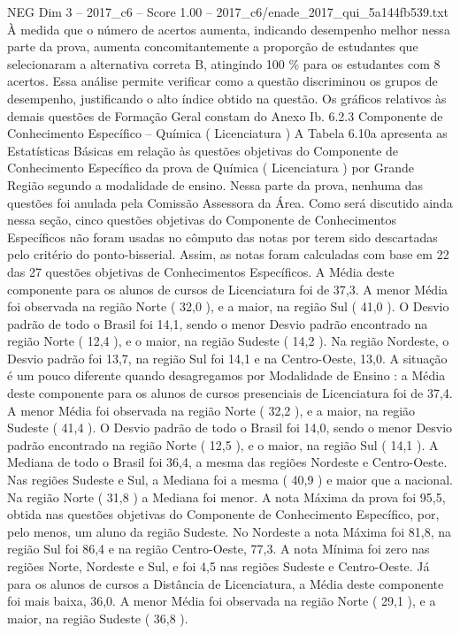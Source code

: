 \begin{textsample}{NEG Dim 3 – 2017\_c6 – Score 1.00 – 2017\_c6/enade\_2017\_qui\_5a144fb539.txt}
À medida que o número de acertos aumenta, indicando desempenho melhor nessa parte da prova, aumenta concomitantemente a proporção de estudantes que selecionaram a alternativa correta B, atingindo 100 \% para os estudantes com 8 acertos.
Essa análise permite verificar como a questão discriminou os grupos de desempenho, justificando o alto índice obtido na questão.
Os gráficos relativos às demais questões de Formação Geral constam do Anexo Ib. 6.2.3 Componente de Conhecimento Específico – Química ( Licenciatura ) A Tabela 6.10a apresenta as Estatísticas Básicas em relação às questões objetivas do Componente de Conhecimento Específico da prova de Química ( Licenciatura ) por Grande Região segundo a modalidade de ensino.
Nessa parte da prova, nenhuma das questões foi anulada pela Comissão Assessora da Área.
Como será discutido ainda nessa seção, cinco questões objetivas do Componente de Conhecimentos Específicos não foram usadas no cômputo das notas por terem sido descartadas pelo critério do ponto-bisserial.
Assim, as notas foram calculadas com base em 22 das 27 questões objetivas de Conhecimentos Específicos.
A Média deste componente para os alunos de cursos de Licenciatura foi de 37,3.
A menor Média foi observada na região Norte ( 32,0 ), e a maior, na região Sul ( 41,0 ).
O Desvio padrão de todo o Brasil foi 14,1, sendo o menor Desvio padrão encontrado na região Norte ( 12,4 ), e o maior, na região Sudeste ( 14,2 ).
Na região Nordeste, o Desvio padrão foi 13,7, na região Sul foi 14,1 e na Centro-Oeste, 13,0.
A situação é um pouco diferente quando desagregamos por Modalidade de Ensino : a Média deste componente para os alunos de cursos presenciais de Licenciatura foi de 37,4.
A menor Média foi observada na região Norte ( 32,2 ), e a maior, na região Sudeste ( 41,4 ).
O Desvio padrão de todo o Brasil foi 14,0, sendo o menor Desvio padrão encontrado na região Norte ( 12,5 ), e o maior, na região Sul ( 14,1 ).
A Mediana de todo o Brasil foi 36,4, a mesma das regiões Nordeste e Centro-Oeste.
Nas regiões Sudeste e Sul, a Mediana foi a mesma ( 40,9 ) e maior que a nacional.
Na região Norte ( 31,8 ) a Mediana foi menor.
A nota Máxima da prova foi 95,5, obtida nas questões objetivas do Componente de Conhecimento Específico, por, pelo menos, um aluno da região Sudeste.
No Nordeste a nota Máxima foi 81,8, na região Sul foi 86,4 e na região Centro-Oeste, 77,3.
A nota Mínima foi zero nas regiões Norte, Nordeste e Sul, e foi 4,5 nas regiões Sudeste e Centro-Oeste.
Já para os alunos de cursos a Distância de Licenciatura, a Média deste componente foi mais baixa, 36,0.
A menor Média foi observada na região Norte ( 29,1 ), e a maior, na região Sudeste ( 36,8 ).

\end{textsample}
